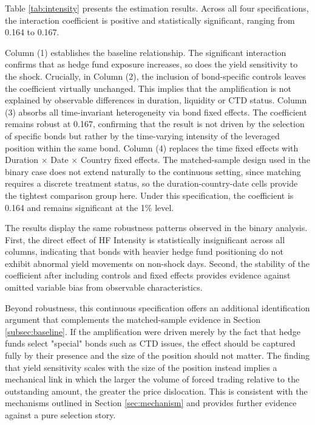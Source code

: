 \documentclass[english, 11pt, oneside]{article}
\begin{document}
Table \ref{tab:intensity} presents the estimation results. Across all four specifications, the interaction coefficient is positive and statistically significant, ranging from 0.164 to 0.167.

Column (1) establishes the baseline relationship. The significant interaction confirms that as hedge fund exposure increases, so does the yield sensitivity to the shock. Crucially, in Column (2), the inclusion of bond-specific controls leaves the coefficient virtually unchanged. This implies that the amplification is not explained by observable differences in duration, liquidity or CTD status. Column (3) absorbs all time-invariant heterogeneity via bond fixed effects. The coefficient remains robust at 0.167, confirming that the result is not driven by the selection of specific bonds but rather by the time-varying intensity of the leveraged position within the same bond. Column (4) replaces the time fixed effects with Duration $\times$ Date $\times$ Country fixed effects. The matched-sample design used in the binary case does not extend naturally to the continuous setting, since matching requires a discrete treatment status, so the duration-country-date cells provide the tightest comparison group here. Under this specification, the coefficient is 0.164 and remains significant at the 1\% level.

The results display the same robustness patterns observed in the binary analysis. First, the direct effect of HF Intensity is statistically insignificant across all columns, indicating that bonds with heavier hedge fund positioning do not exhibit abnormal yield movements on non-shock days. Second, the stability of the coefficient after including controls and fixed effects provides evidence against omitted variable bias from observable characteristics.

Beyond robustness, this continuous specification offers an additional identification argument that complements the matched-sample evidence in Section \ref{subsec:baseline}. If the amplification were driven merely by the fact that hedge funds select "special" bonds such as CTD issues, the effect should be captured fully by their presence and the size of the position should not matter. The finding that yield sensitivity scales with the size of the position instead implies a mechanical link in which the larger the volume of forced trading relative to the outstanding amount, the greater the price dislocation. This is consistent with the mechanisms outlined in Section \ref{sec:mechanism} and provides further evidence against a pure selection story.
\end{document}
